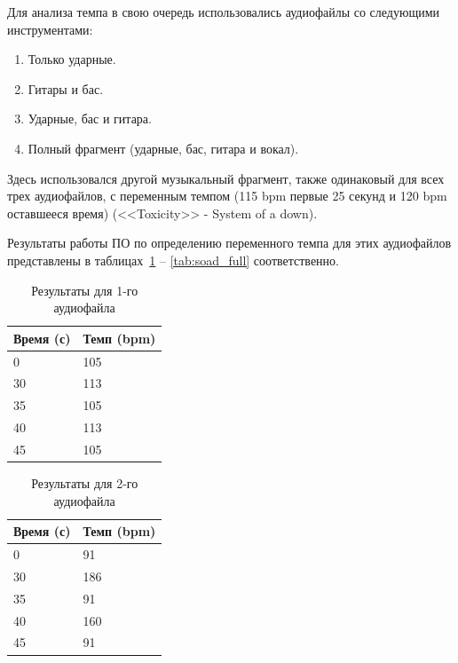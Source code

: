 \newpage

Для анализа темпа в свою очередь использовались аудиофайлы со следующими инструментами:

\begin{enumerate}
	\item Только ударные.
	\item Гитары и бас.
	\item Ударные, бас и гитара.
	\item Полный фрагмент (ударные, бас, гитара и вокал).
\end{enumerate}

Здесь использовался другой музыкальный фрагмент, также одинаковый для всех трех аудиофайлов, с переменным темпом (115 bpm первые 25 секунд и 120 bpm оставшееся время) (<<Toxicity>> - System of a down).

Результаты работы ПО по определению переменного темпа для этих аудиофайлов представлены в таблицах~\ref{tab:soad_drums} -- \ref{tab:soad_full} соответственно.

\begin{table}[!h]
	\begin{center}
		\caption{\label{tab:soad_drums}Результаты для 1-го аудиофайла}
		\begin{tabular}{|p{8cm}|p{8cm}|}
			\hline
			Время (с) & Темп (bpm)\\
			\hline
			0 & 105\\
			\hline
			30 & 113\\
			\hline
			35 & 105\\
			\hline
			40 & 113\\
			\hline
			45 & 105\\
			\hline
		\end{tabular}
	\end{center}
\end{table}

\begin{table}[!h]
	\begin{center}
		\caption{\label{tab:soad_guitar}Результаты для 2-го аудиофайла}
		\begin{tabular}{|p{8cm}|p{8cm}|}
			\hline
			Время (с) & Темп (bpm)\\
			\hline
			0 & 91\\
			\hline
			30 & 186\\
			\hline
			35 & 91\\
			\hline
			40 & 160\\
			\hline
			45 & 91\\
			\hline
		\end{tabular}
	\end{center}
\end{table}

